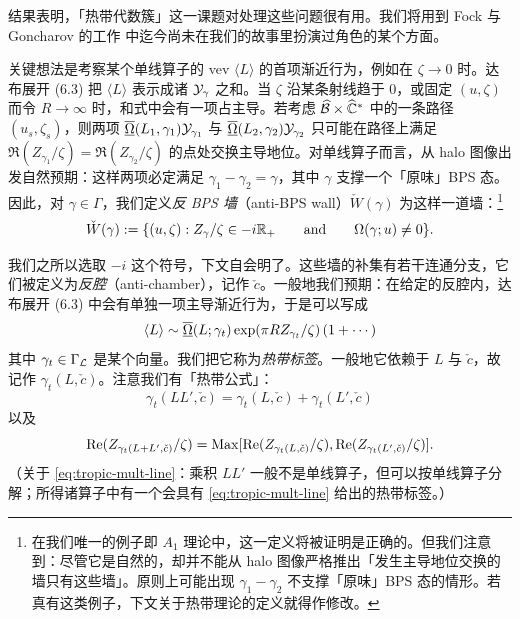 结果表明，「热带代数簇」这一课题对处理这些问题很有用。我们将用到 Fock 与 Goncharov 的工作 \cite{MR2233852} 中迄今尚未在我们的故事里扮演过角色的某个方面。

关键想法是考察某个单线算子的 vev $\langle L\rangle$ 的首项渐近行为，例如在 $\zeta\to 0$ 时。达布展开 (6.3)%
把 $\langle L\rangle$ 表示成诸 $\mathcal{Y}_\gamma$ 之和。当 $\zeta$ 沿某条射线趋于 $0$，或固定 $(u,\zeta)$ 而令 $R\to\infty$ 时，和式中会有一项占主导。若考虑 $\widehat{\mathcal{B}}\times\widehat{\mathbb{C}}^*$ 中的一条路径 $(u_s,\zeta_s)$，则两项 $\overline{\underline{\Omega}}(L_1,\gamma_1)\mathcal{Y}_{\gamma_1}$ 与 $\overline{\underline{\Omega}}(L_2,\gamma_2)\mathcal{Y}_{\gamma_2}$ 只可能在路径上满足 ${\Re}(Z_{\gamma_1}/\zeta)={\Re}(Z_{\gamma_2}/\zeta)$ 的点处交换主导地位。对单线算子而言，从 halo 图像出发自然预期：这样两项必定满足 $\gamma_1-\gamma_2=\gamma$，其中 $\gamma$ 支撑一个「原味」BPS 态。因此，对 $\gamma\in\Gamma$，我们定义\emph{反 BPS 墙}（anti-BPS wall）$\check W(\gamma)$ 为这样一道墙：\footnote{在我们唯一的例子即 $A_1$ 理论中，这一定义将被证明是正确的。但我们注意到：尽管它是自然的，却并不能从 halo 图像严格推出「发生主导地位交换的墙只有这些墙」。原则上可能出现 $\gamma_1-\gamma_2$ 不支撑「原味」BPS 态的情形。若真有这类例子，下文关于热带理论的定义就得作修改。}
\begin{equation}
\check W(\gamma):= \{(u,\zeta): Z_\gamma/\zeta \in -i\mathbb{R}_+ \qquad {\rm and} \qquad \Omega(\gamma;u)\not=0\}.
\end{equation}

我们之所以选取 $-i$ 这个符号，下文自会明了。这些墙的补集有若干连通分支，它们被定义为\emph{反腔}（anti-chamber），记作 $\check c$。一般地我们预期：在给定的反腔内，达布展开 (6.3)%
中会有单独一项主导渐近行为，于是可以写成
\begin{equation}
\langle L\rangle \sim \overline{\underline{\Omega}}(L;\gamma_t)\exp(\pi R Z_{\gamma_t}/\zeta)\left(1+\cdots\right)
\end{equation}
其中 $\gamma_t\in\Gamma_{\mathcal{L}}$ 是某个向量。我们把它称为\emph{热带标签}。一般地它依赖于 $L$ 与 $\check c$，故记作 $\gamma_t(L,\check c)$。注意我们有「热带公式」：
\begin{equation}\label{eq:tropic-mult-line}
\gamma_t(LL',\check c) = \gamma_t(L,\check c) + \gamma_t(L',\check c)
\end{equation}
以及
\begin{equation}
{\rm Re}(Z_{\gamma_t(L+L',\check c)}/\zeta) = {\rm Max}[{\rm Re}(Z_{\gamma_t(L,\check c)}/\zeta), {\rm Re}(Z_{\gamma_t(L',\check c)}/\zeta)].
\end{equation}
（关于 \eqref{eq:tropic-mult-line}：乘积 $LL'$ 一般不是单线算子，但可以按单线算子分解；所得诸算子中有一个会具有 \eqref{eq:tropic-mult-line} 给出的热带标签。）

